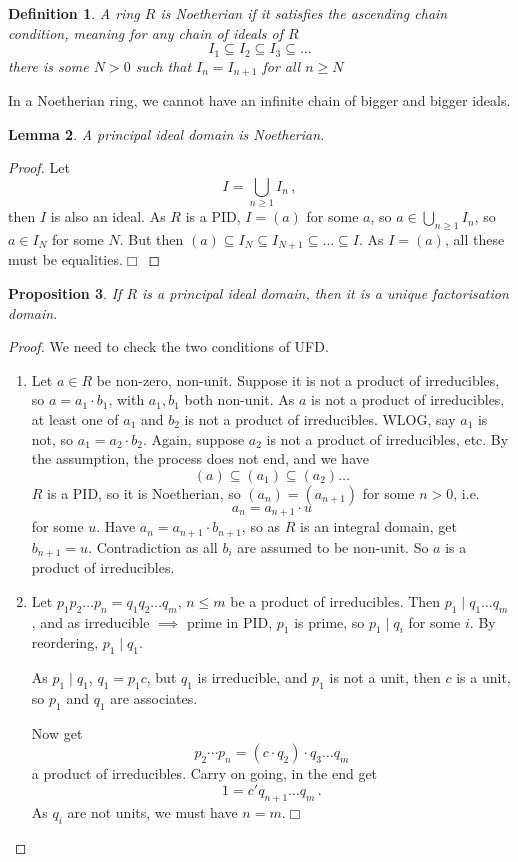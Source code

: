 \documentclass{article}
\theoremstyle{plain}\theoremheaderfont{\normalfont\itshape}\theorembodyfont{\rmfamily}\theoremseparator{.}\newtheorem*{rem}{Remark}\newtheorem*{ex}{Example}\newtheorem*{proof}{Proof}\newtheorem*{altp}{Alternative proof}\newtheorem*{nonex}{Non-Example}
\theoremstyle{plain}\theoremheaderfont{\normalfont\bfseries}\theorembodyfont{\rmfamily}\theoremseparator{.}\newtheorem{thm}{Theorem}[section]\newtheorem{lem}[thm]{Lemma}\newtheorem{prop}[thm]{Proposition}\newtheorem*{cor}{Corollary}\newtheorem{defn}[thm]{Definition}\newtheorem{clm}[thm]{Claim}\newtheorem{clminproof}{Claim}\newtheorem*{notn}{Notation}\newtheorem*{exer}{Exercise}\newtheorem*{lemnn}{Lemma}
\theoremstyle{break}\theoremheaderfont{\normalfont\itshape}\theorembodyfont{\rmfamily}\theoremseparator{.\medskip}\newtheorem*{proofskip}{Proof}\newtheorem*{exs}{Examples}\newtheorem*{rems}{Remarks}\newtheorem*{obs}{Observations}
\theoremstyle{break}\theoremheaderfont{\normalfont\bfseries}\theorembodyfont{\rmfamily}\theoremseparator{.\medskip}\newtheorem{lemskip}[thm]{Lemma}\newtheorem{defnskip}[thm]{Definition}\newtheorem{propskip}[thm]{Proposition}\newtheorem{thmskip}[thm]{Theorem}
\numberwithin{equation}{section}
\newcommand{\qed}{\hfill\ensuremath{\Box}}
\begin{document}
    \begin{defn}
        A ring \(R\) is \textit{Noetherian} if it satisfies the \textit{ascending chain condition}, meaning for any chain of ideals of \(R\)
        \[I_1\subseteq I_2\subseteq I_3\subseteq\dots \]
        there is some \(N>0\) such that \(I_n=I_{n+1}\) for all \(n\ge N\)
    \end{defn}
    In a Noetherian ring, we cannot have an infinite chain of bigger and bigger ideals.
    \begin{lem}
        A principal ideal domain is Noetherian.
    \end{lem}
    \begin{proof}
        Let
        \[I=\bigcup_{n\ge 1}I_n\,,\]
        then \(I\) is also an ideal. As \(R\) is a PID, \(I=(a)\) for some \(a\), so \(a\in\bigcup_{n\ge 1}I_n\), so \(a\in I_N\) for some \(N\). But then \((a)\subseteq I_N\subseteq I_{N+1}\subseteq\dots\subseteq I\). As \(I=(a)\), all these must be equalities.\qed
    \end{proof}
    \begin{prop}
        If \(R\) is a principal ideal domain, then it is a unique factorisation domain.
    \end{prop}
    \begin{proof}
        We need to check the two conditions of UFD.
        \begin{enumerate}[topsep=0pt,label=(\roman*)]
            \item Let \(a\in R\) be non-zero, non-unit. Suppose it is not a product of irreducibles, so \(a=a_1\cdot b_1\), with \(a_1,b_1\) both non-unit. As \(a\) is not a product of irreducibles, at least one of \(a_1\) and \(b_2\) is not a product of irreducibles. WLOG, say \(a_1\) is not, so \(a_1=a_2\cdot b_2\). Again, suppose \(a_2\) is not a product of irreducibles, etc. By the assumption, the process does not end, and we have
            \[(a)\subseteq (a_1)\subseteq (a_2)\dots\]
            \(R\) is a PID, so it is Noetherian, so \((a_n)=(a_{n+1})\) for some \(n>0\), i.e.
            \[a_n=a_{n+1}\cdot u\]
            for some \(u\). Have \(a_n=a_{n+1}\cdot b_{n+1}\), so as \(R\) is an integral domain, get \(b_{n+1}=u\). Contradiction as all \(b_{i}\) are assumed to be non-unit. So \(a\) is a product of irreducibles.
            \item Let \(p_1p_2\dots p_n=q_1q_2\dots q_m\), \(n\le m\) be a product of irreducibles. Then \(p_1\mid q_1\dots q_m\), and as irreducible \(\implies\) prime in PID, \(p_1\) is prime, so \(p_1\mid q_i\) for some \(i\). By reordering, \(p_1\mid q_1\).
            
            As \(p_1\mid q_1\), \(q_1=p_1c\), but \(q_1\) is irreducible, and \(p_1\) is not a unit, then \(c\) is a unit, so \(p_1\) and \(q_1\) are associates.

            Now get
            \[p_2\cdots p_n=(c\cdot q_2)\cdot q_3\dots q_m\]
            a product of irreducibles. Carry on going, in the end get
            \[1=c'q_{n+1}\dots q_{m}\,.\]
            As \(q_i\) are not units, we must have \(n=m\).\qed
        \end{enumerate}
    \end{proof}
\end{document}
